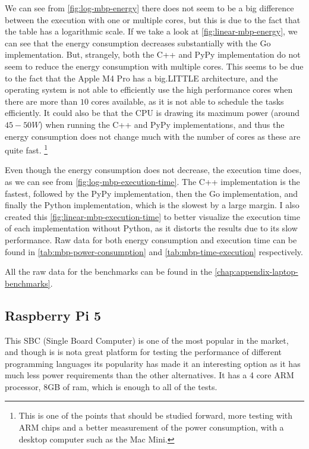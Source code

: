 We can see from \autoref{fig:log-mbp-energy} there does not seem to be a big difference between the execution with one or multiple cores, but this is due to the fact that the table has a logarithmic scale. If we take a look at \autoref{fig:linear-mbp-energy}, we can see that the energy consumption decreases substantially with the Go implementation. But, strangely, both the C++ and PyPy implementation do not seem to reduce the energy consumption with multiple cores. This seems to be due to the fact that the Apple M4 Pro has a big.LITTLE architecture, and the operating system is not able to efficiently use the high performance cores when there are more than $10$ cores available, as it is not able to schedule the tasks efficiently. It could also be that the CPU is drawing its maximum power (around $45-50W$) when running the C++ and PyPy implementations, and thus the energy consumption does not change much with the number of cores as these are quite fast. \footnote{This is one of the points that should be studied forward, more testing with \gls{ARM} chips and a better measurement of the power consumption, with a desktop computer such as the Mac Mini.}

Even though the energy consumption does not decrease, the execution time does, as we can see from \autoref{fig:log-mbp-execution-time}. The C++ implementation is the fastest, followed by the PyPy implementation, then the Go implementation, and finally the Python implementation, which is the slowest by a large margin. I also created this \autoref{fig:linear-mbp-execution-time} to better visualize the execution time of each implementation without Python, as it distorts the results due to its slow performance. Raw data for both energy consumption and execution time can be found in \autoref{tab:mbp-power-consumption} and \autoref{tab:mbp-time-execution} respectively.

All the raw data for the benchmarks can be found in the \autoref{chap:appendix-laptop-benchmarks}.

\FloatBarrier
\subsection{Raspberry Pi 5}
This SBC (Single Board Computer) is one of the most popular in the market, and though is is nota great platform for testing the performance of different programming languages its popularity has made it an interesting option as it has much less power requirements than the other alternatives. It has a 4 core \gls{ARM} processor, 8GB of \gls{ram}, which is enough to all of the tests. 

